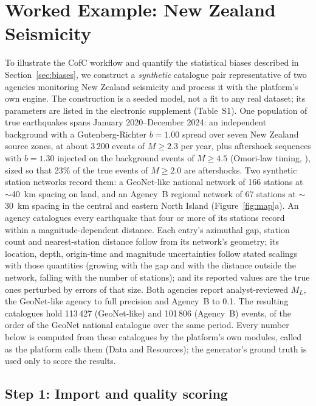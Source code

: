 \documentclass[12pt]{article}
\begin{document}
\section{Worked Example: New Zealand Seismicity}
\label{sec:example}

To illustrate the CofC workflow and quantify the statistical biases described
in Section~\ref{sec:biases}, we construct a \emph{synthetic} catalogue pair
representative of two agencies monitoring New Zealand seismicity and process it
with the platform's own engine.  The construction is a seeded model, not a fit to
any real dataset; its parameters are listed in the electronic supplement
(Table~S1).  One population of true earthquakes spans January 2020--December
2024: an independent background with a Gutenberg-Richter $b = 1.00$ spread over
seven New Zealand source zones, at about 3\,200 events of $M \geq 2.3$ per year,
plus aftershock sequences with $b = 1.30$ injected on the background events of
$M \geq 4.5$ (Omori-law timing, \citealp{omori1894,utsu1961}), sized so that 23\%
of the true events of $M \geq 2.0$ are aftershocks.  Two synthetic station
networks record them: a GeoNet-like national network of 166 stations at
$\sim$40~km spacing on land, and an Agency~B regional network of 67 stations at
$\sim$30~km spacing in the central and eastern North Island
(Figure~\ref{fig:map}a).  An agency catalogues every earthquake that four or more
of its stations record within a magnitude-dependent distance.  Each entry's
azimuthal gap, station count and nearest-station distance follow from its
network's geometry; its location, depth, origin-time and magnitude uncertainties
follow stated scalings with those quantities (growing with the gap and with the
distance outside the network, falling with the number of stations); and its
reported values are the true ones perturbed by errors of that size.  Both agencies
report analyst-reviewed $M_L$, the GeoNet-like agency to full precision and
Agency~B to 0.1.  The resulting catalogues hold 113\,427 (GeoNet-like) and
101\,806 (Agency~B) events, of the order of the GeoNet national catalogue over the
same period.  Every number below is computed from these catalogues by the
platform's own modules, called as the platform calls them (Data and Resources);
the generator's ground truth is used only to score the results.

\subsection{Step 1: Import and quality scoring}
\end{document}
